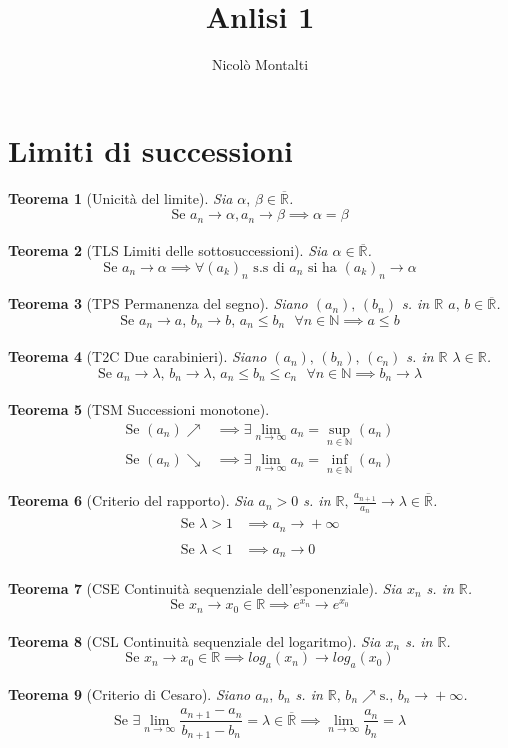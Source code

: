 \documentclass[10pt,a4paper]{article}
\title{Anlisi 1}
\author{Nicolò Montalti}
\date{}
\newtheorem{teorema}{Teorema}[section]
\newcommand{\teor}[2][]{\begin{teorema}[#1]#2\end{teorema}}
\newcommand{\R}{\mathbb{R}}
\newcommand{\N}{\mathbb{N}}
\newcommand{\Rbar}{\overline{\mathbb{R}}}
\newcommand{\Lim}[1][]{\xrightarrow[#1]{}}
\renewcommand{\,}{\text{, }}
\begin{document}
\maketitle
\section{Limiti di successioni}
\teor[Unicità del limite]{Sia $\alpha\, \beta \in \Rbar$.
    \[
        \text{Se } a_n \Lim \alpha, a_n \Lim \beta \implies \alpha = \beta
    \]
}
\teor[TLS Limiti delle sottosuccessioni]{
    Sia $\alpha \in \Rbar$.
    \[
        \text{Se } a_n \Lim \alpha \implies \forall (a_k)_n \text{ s.s di } a_n \text{ si ha }(a_k)_n \Lim \alpha
    \]
}
\teor[TPS Permanenza del segno]{
    Siano $(a_n)\, (b_n)$ s. in $\R$\, $a\,b \in \Rbar$.
    \[
        \text{Se } a_n \Lim a\, b_n \Lim b\, a_n \leq b_n \text{ } \forall n \in \N \implies a \leq  b
    \]
}
\teor[T2C Due carabinieri]{
    Siano $(a_n)\, (b_n)\, (c_n)$ s. in $\R$\, $\lambda \in \R$.
    \[
        \text{Se } a_n \Lim \lambda\, b_n \Lim \lambda\, a_n \leq b_n \leq c_n \text{ } \forall n \in \N \implies b_n \Lim \lambda
    \]
}
\teor[TSM Successioni monotone]{
    \begin{align*}
        \text{Se } (a_n) \nearrow & \implies \exists \lim_{n\to\infty} a_n = \sup_{n \in \N} (a_n) \\
        \text{Se } (a_n) \searrow & \implies \exists \lim_{n\to\infty} a_n = \inf_{n \in \N} (a_n)
    \end{align*}
}
\teor[Criterio del rapporto]{
    Sia $a_n > 0$ s. in $\R \, \frac{a_{n+1}}{a_n} \Lim \lambda \in \Rbar$.
    \begin{align*}
        \text{Se } \lambda > 1 & \implies a_n \Lim +\infty \\
        \text{Se } \lambda < 1 & \implies a_n \Lim 0
    \end{align*}
}
\teor[CSE Continuità sequenziale dell'esponenziale]{
    Sia $x_n$ s. in $\R$.
    \[
        \text{Se } x_n \Lim x_0 \in \R \implies e^{x_n} \Lim e^{x_0}
    \]
}
\teor[CSL Continuità sequenziale del logaritmo]{
    Sia $x_n$ s. in $\R$.
    \[
        \text{Se } x_n \Lim x_0 \in \R \implies log_a(x_n) \Lim log_a(x_0)
    \]
}
\teor[Criterio di Cesaro]{
    Siano $a_n\, b_n$ s. in $\R\, b_n \nearrow \text{s.}\, b_n \Lim +\infty$.
    \[
        \text{Se } \exists \lim_{n\to\infty}\frac{a_{n+1} - a_n}{b_{n+1}-b_n} = \lambda \in \Rbar \implies \lim_{n\to\infty}\frac{a_n}{b_n} = \lambda
    \]
}
\end{document}
